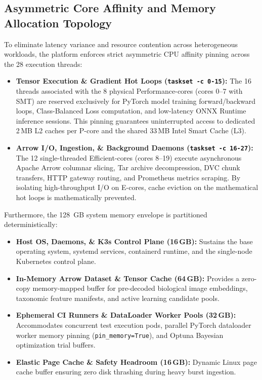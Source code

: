 \subsection{Asymmetric Core Affinity and Memory Allocation Topology}
\label{subsec:core_affinity_topology}

To eliminate latency variance and resource contention across heterogeneous workloads, the platform enforces strict asymmetric CPU affinity pinning across the 28 execution threads:
\begin{itemize}
    \item \textbf{Tensor Execution \& Gradient Hot Loops (\texttt{taskset -c 0-15}):} The 16 threads associated with the 8 physical Performance-cores (cores 0--7 with SMT) are reserved exclusively for PyTorch model training forward/backward loops, Class-Balanced Loss computation, and low-latency ONNX Runtime inference sessions. This pinning guarantees uninterrupted access to dedicated 2\,MB L2 caches per P-core and the shared 33\,MB Intel Smart Cache (L3).
    \item \textbf{Arrow I/O, Ingestion, \& Background Daemons (\texttt{taskset -c 16-27}):} The 12 single-threaded Efficient-cores (cores 8--19) execute asynchronous Apache Arrow columnar slicing, Tar archive decompression, DVC chunk transfers, HTTP gateway routing, and Prometheus metrics scraping. By isolating high-throughput I/O on E-cores, cache eviction on the mathematical hot loops is mathematically prevented.
\end{itemize}

Furthermore, the 128~GB system memory envelope is partitioned deterministically:
\begin{itemize}
    \item \textbf{Host OS, Daemons, \& K3s Control Plane (16\,GB):} Sustains the base operating system, systemd services, containerd runtime, and the single-node Kubernetes control plane.
    \item \textbf{In-Memory Arrow Dataset \& Tensor Cache (64\,GB):} Provides a zero-copy memory-mapped buffer for pre-decoded biological image embeddings, taxonomic feature manifests, and active learning candidate pools.
    \item \textbf{Ephemeral CI Runners \& DataLoader Worker Pools (32\,GB):} Accommodates concurrent test execution pods, parallel PyTorch dataloader worker memory pinning (\texttt{pin\_memory=True}), and Optuna Bayesian optimization trial buffers.
    \item \textbf{Elastic Page Cache \& Safety Headroom (16\,GB):} Dynamic Linux page cache buffer ensuring zero disk thrashing during heavy burst ingestion.
\end{itemize}

